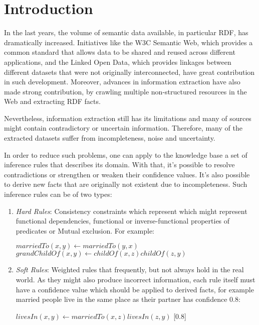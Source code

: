 \chapter{Introduction}
\label{ch:intro}

In the last years, the volume of semantic data available, in particular RDF, has dramatically increased. Initiatives like the W3C Semantic Web, which provides a common standard that allows data to be shared and reused across different applications, and the Linked Open Data, which provides linkages between different datasets that were not originally interconnected, have great contribution in such development. Moreover, advances in information extraction have also made strong contribution, by crawling multiple non-structured resources in the Web and extracting RDF facts.

Nevertheless, information extraction still has its limitations and many of sources might contain contradictory or uncertain information. Therefore, many of the extracted datasets suffer from incompleteness, noise and uncertainty.

In order to reduce such problems, one can apply to the knowledge base a set of inference rules that describes its domain. With that, it's possible to resolve contradictions or strengthen or weaken their confidence values. It's also possible to derive new facts that are originally not existent due to incompleteness. Such inference rules can be of two types:

\begin{enumerate}

 \item \emph{Hard Rules}: Consistency constraints which represent which might represent functional dependencies, functional or inverse-functional properties of predicates or Mutual exclusion. For example:
    \begin{center}
      \begin{math} marriedTo(x,y) \leftarrow marriedTo(y,x)\end{math}
      \begin{math} grandChildOf(x,y) \leftarrow childOf(x,z)childOf(z,y)\end{math}
    \end{center}

 \item \emph{Soft Rules}: Weighted rules that frequently, but not always hold in the real world. As they might also produce incorrect information, each rule itself must have a confidence value which should be applied to derived facts, for example married people live in the same place as their partner has confidence 0.8:
    \begin{center}
      \begin{math} livesIn(x,y) \leftarrow marriedTo(x,z)livesIn(z,y)\end{math} [0.8]
    \end{center}
\end{enumerate}

